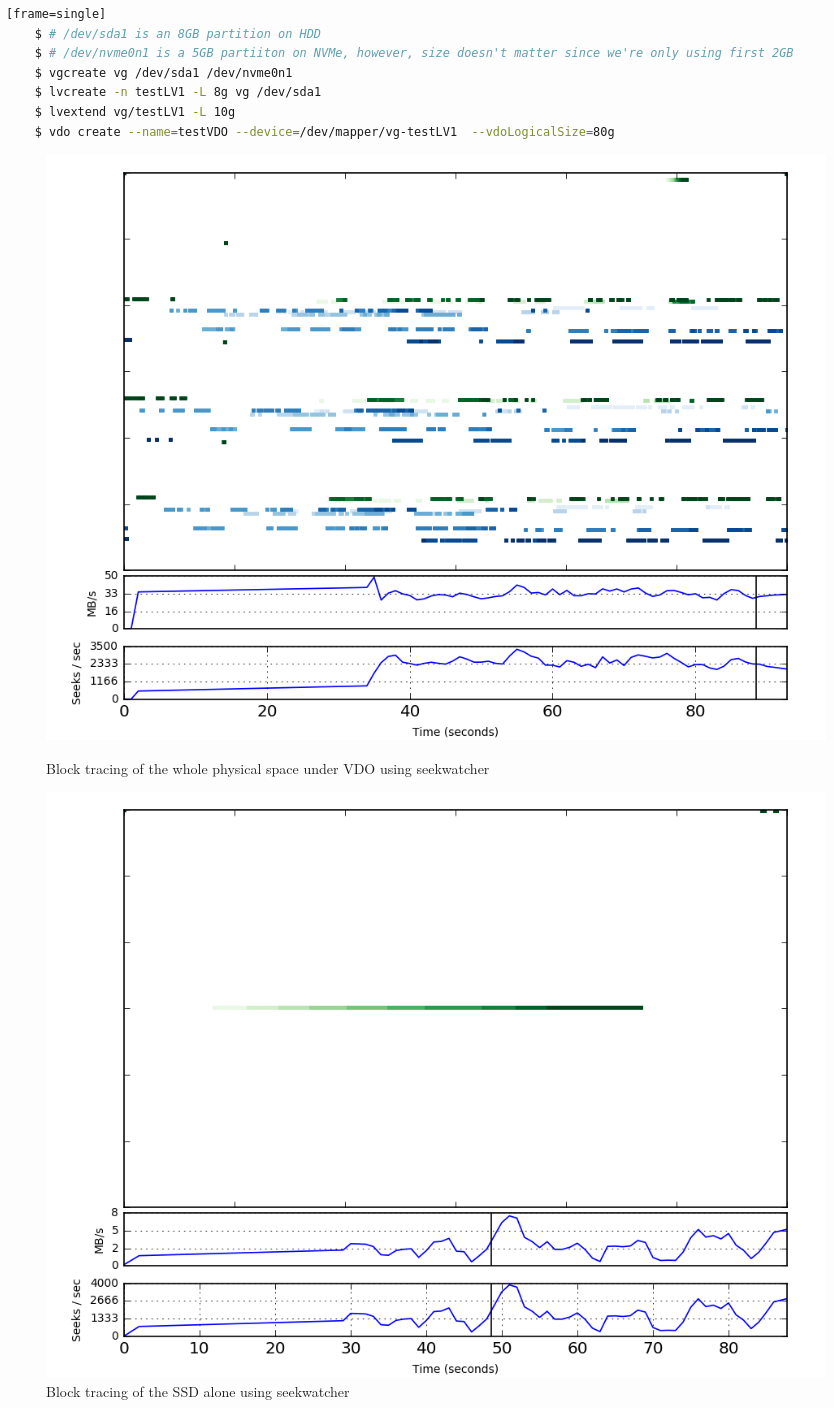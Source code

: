 \documentclass[
  color, %
  table, %
  lof,   %
  lot,   %
]{fithesis3}
\begin{document}
\begin{lstlisting}[language=bash, label={ex:fast-journal}, caption={Creating a volume with last reagion on NVMe device}][frame=single]
    $ # /dev/sda1 is an 8GB partition on HDD
    $ # /dev/nvme0n1 is a 5GB partiiton on NVMe, however, size doesn't matter since we're only using first 2GB
    $ vgcreate vg /dev/sda1 /dev/nvme0n1
    $ lvcreate -n testLV1 -L 8g vg /dev/sda1
    $ lvextend vg/testLV1 -L 10g
    $ vdo create --name=testVDO --device=/dev/mapper/vg-testLV1  --vdoLogicalSize=80g
\end{lstlisting}

\begin{figure}[!htb]
        \centering
        \includegraphics[width=\textwidth]{../results/journal/seeks/snaps/ssd_testlv}
\caption[Journal]{Block tracing of the whole physical space under VDO using seekwatcher}
\label{fig:journal-LV}
        \centering
        \includegraphics[width=\textwidth]{../results/journal/seeks/snaps/ssd}
\caption[Journal]{Block tracing of the SSD alone using seekwatcher}
\label{fig:journal-SSD}
\end{figure}
\end{document}
